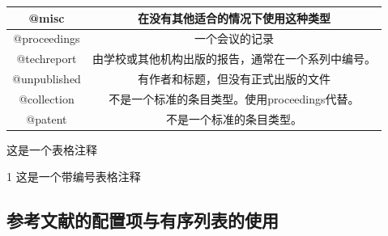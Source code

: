 \documentclass{bjfu}
\begin{document}
\begin{table}[h]
{\begin{threeparttable}
\begin{tabular}{c|c}
                \hline
                @misc& 在没有其他适合的情况下使用这种类型 \\
                \hline
                @proceedings &一个会议的记录 \\
                \hline
                @techreport &由学校或其他机构出版的报告，通常在一个系列中编号。 \\
                \hline
                @unpublished& 有作者和标题，但没有正式出版的文件 \\
                \hline
                @collection& 不是一个标准的条目类型。使用proceedings代替。 \\
                \hline
                @patent& 不是一个标准的条目类型。 \\
                \hline
            \end{tabular}
            \begin{tablenotes}
                \tiny
                \item  这是一个表格注释
                \item[1]  这是一个带编号表格注释%
            \end{tablenotes} 
        \end{threeparttable}
    }
    \label{Table:reference} %
\end{table}

\subsection{参考文献的配置项与有序列表的使用}
\end{document}
